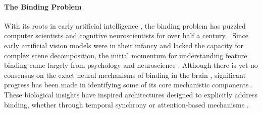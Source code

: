 \documentclass{article}
\theoremstyle{plain}
\theoremstyle{definition}
\theoremstyle{remark}
\begin{document}
\paragraph{The Binding Problem}
With its roots in early artificial intelligence \cite{rosenblatt1962principles}, the binding problem has puzzled computer scientists and cognitive neuroscientists for over half a century \cite{greff2020bindingproblemartificialneural, von1999and, feldman2013neural, roskies1999binding, treisman1996binding}. Since early artificial vision models were in their infancy and lacked the capacity for complex scene decomposition, the initial momentum for understanding feature binding came largely from psychology and neuroscience \cite{treisman1999solutions, vonderMalsburg1981Correlation}. Although there is yet no consensus on the exact neural mechanisms of binding in the brain \cite{robertson2003binding, wolfe2012binding, di2012feature, scholte2025beyond, roelfsema2025feature}, significant progress has been made in identifying some of its core mechanistic components \cite{TREISMAN198097, reynolds1999role, roelfsema2023solving, singer1995visual}. These biological insights have inspired architectures designed to explicitly address binding, whether through temporal synchrony \cite{miyato2024artificial, gopalakrishnan2024recurrent} or attention-based mechanisms \cite{salehi2024modeling}.
\end{document}
